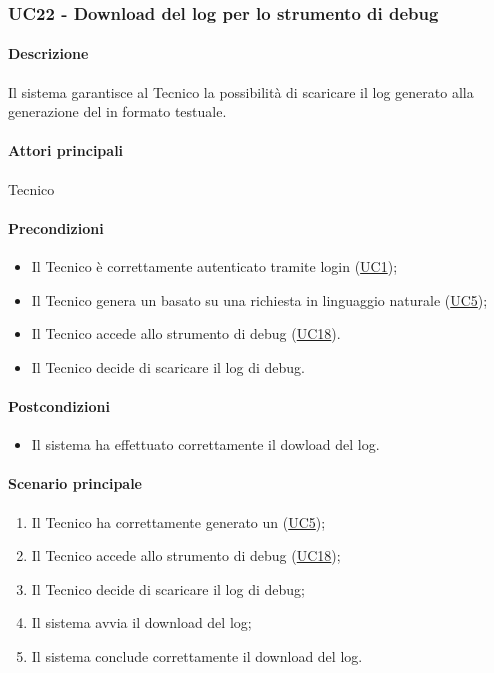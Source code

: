 \subsubsection{UC22 - Download del log per lo strumento di debug}\label{UC22}
\paragraph*{Descrizione}
Il sistema garantisce al Tecnico la possibilità di scaricare il log generato alla generazione del  in formato testuale.

\paragraph*{Attori principali}
Tecnico

\paragraph*{Precondizioni}
\begin{itemize}
  \item Il Tecnico è correttamente autenticato tramite login (\hyperref[UC1]{UC1});
  \item Il Tecnico genera un  basato su una richiesta in linguaggio naturale (\hyperref[UC5]{UC5});
  \item Il Tecnico accede allo strumento di debug (\hyperref[UC18]{UC18}).
  \item Il Tecnico decide di scaricare il log di debug.
\end{itemize}

\paragraph*{Postcondizioni}
\begin{itemize}
  \item Il sistema ha effettuato correttamente il dowload del log.
\end{itemize}

\paragraph*{Scenario principale}
\begin{enumerate}
  \item Il Tecnico ha correttamente generato un  (\hyperref[UC5]{UC5});
  \item Il Tecnico accede allo strumento di debug (\hyperref[UC18]{UC18});
  \item Il Tecnico decide di scaricare il log di debug;
  \item Il sistema avvia il download del log;
  \item Il sistema conclude correttamente il download del log.
\end{enumerate}

